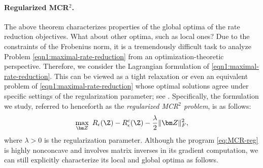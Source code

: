 \documentclass[../../book-main.tex]{subfiles}
\begin{document}
\paragraph{Regularized MCR$^2$.}
The above theorem characterizes properties of the global optima of the rate reduction objectives. What about other optima, such as local ones?  Due to the constraints of the Frobenius norm, it is a tremendously difficult task to analyze Problem \eqref{eqn1:maximal-rate-reduction} from an optimization-theoretic perspective. Therefore, we consider the Lagrangian formulation of \eqref{eqn1:maximal-rate-reduction}. This can be viewed as a tight relaxation or even an equivalent problem of \eqref{eqn1:maximal-rate-reduction} whose optimal solutions agree under specific settings of the regularization parameter; see \cite[Proposition 1]{wang2024global}.
Specifically, the formulation we study, referred to henceforth as the \textit{regularized MCR$^2$ problem}, is as follows:
\begin{align}\label{eq:MCR-reg}
	\max_{\bm Z}\ R_{\epsilon}(\Z) - R_{\epsilon}^c(\Z) - \frac{\lambda}{2}\|\bm Z\|_F^2,
\end{align}
where $\lambda > 0$ is the regularization parameter. Although the program  \eqref{eq:MCR-reg} is highly nonconcave and involves matrix inverses in its gradient computation, we can still explicitly characterize its local and global optima as follows.
\end{document}
